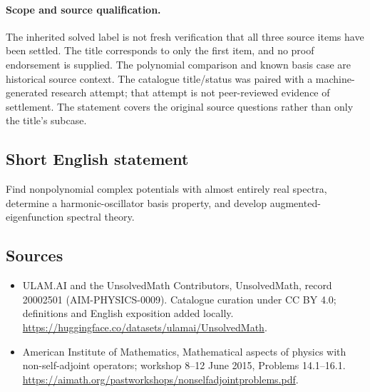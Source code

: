 \documentclass[11pt]{article}
\begin{document}
\paragraph{Scope and source qualification.}The inherited solved label is not fresh verification that all three source items have been settled. The title corresponds to only the first item, and no proof endorsement is supplied. The polynomial comparison and known basis case are historical source context. The catalogue title/status was paired with a machine-generated research attempt; that attempt is not peer-reviewed evidence of settlement. The statement covers the original source questions rather than only the title’s subcase.
\subsection{Short English statement}
Find nonpolynomial complex potentials with almost entirely real spectra, determine a harmonic-oscillator basis property, and develop augmented-eigenfunction spectral theory.
\subsection{Sources}
\begin{itemize}
\item[\hypertarget{source:20002501:1}{S1}] ULAM.AI and the UnsolvedMath Contributors, UnsolvedMath, record 20002501 (AIM-PHYSICS-0009). Catalogue curation under CC BY 4.0; definitions and English exposition added locally.
\url{https://huggingface.co/datasets/ulamai/UnsolvedMath}.
\item[\hypertarget{source:20002501:2}{S2}] American Institute of Mathematics, Mathematical aspects of physics with non-self-adjoint operators; workshop 8–12 June 2015, Problems 14.1–16.1.
\url{https://aimath.org/pastworkshops/nonselfadjointproblems.pdf}.
\end{itemize}
\label{end:20002501}
\end{document}
